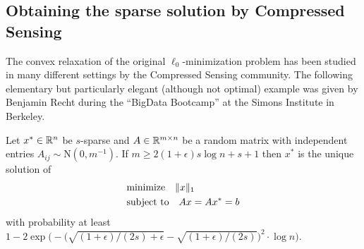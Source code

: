 \documentclass{article} %
\begin{document}
\subsection{Obtaining the sparse solution by Compressed Sensing}
The convex relaxation of the original $\ell_0$-minimization problem
has been studied in many different settings by the Compressed Sensing
community.
The following elementary but particularly elegant (although not optimal) example was given by Benjamin Recht during the ``BigData Bootcamp'' at the Simons Institute in Berkeley.
\begin{theorem}
  Let $x^*\in \mathbb{R}^n$ be $s$-sparse and $A \in \mathbb{R}^{m\times n}$ be a
  random matrix with independent entries $A_{ij}\sim \text{N}(0,
  m^{-1})$. If $m \geq 2 (1+\epsilon) s\log n + s + 1$ then $x^*$ is
  the unique solution of
  \begin{align}
    &\text{minimize}\quad \lVert x\rVert_1\label{CS}\\
    &\text{subject to}\quad Ax = Ax^* = b \nonumber
  \end{align}
  with probability at least $1 - 2\exp\bigl(-\bigl(\sqrt{(1+\epsilon)/(2s) +
      \epsilon} - \sqrt{(1+\epsilon)/(2s)}\bigr)^2\cdot \log n\bigr).$
\end{theorem}
\end{document}
